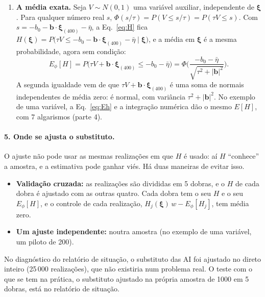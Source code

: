 \documentclass[11pt,a4paper]{article}
\newcommand{\xib}{\bm\xi}
\newcommand{\FS}{\mathrm{FS}}
\begin{document}
\begin{enumerate}
    $\hat g$ não vê: os modos além do 200.º, a não linearidade e o ruído do MEF. Se $\eta$ for normal, com média
    $\bar\eta$ e desvio $\tau$, e independente de $\hat g$, então $P(\FS < 1 \mid \xib) = P(\eta < -\hat g(\xib)) =
    \Phi\big((-\hat g(\xib) - \bar\eta)/\tau\big)$. Daí
    \begin{equation}
      H(\xib) = \Phi\Big(\frac{-\hat g(\xib) - \bar\eta}{\tau}\Big)
      = \Phi\Big(\frac{-b_0 - \bm b\cdot\xib_{(400)} - \bar\eta}{\tau}\Big).
      \label{eq:H}
    \end{equation}
    $\bar\eta$ e $\tau$ são ajustados por máxima verossimilhança nas realizações (o modelo probit: cada realização
    contribui com $\ln H$ se falhou e com $\ln(1 - H)$ se não). O $H$ vai de 0 a 1: é a probabilidade de falha que o
    substituto prevê para aquela realização, uma versão suave de $I$. Na versão anterior, $\bar\eta$, $\tau$ e $b_0$ se
    chamavam $c$, $s$ e $a$.
  \item \textbf{A média exata.} Seja $V \sim N(0, 1)$ uma variável auxiliar, independente de $\xib$. Para qualquer número
    real $s$, $\Phi(s/\tau) = P(V \le s/\tau) = P(\tau V \le s)$. Com $s = -b_0 - \bm b\cdot\xib_{(400)} - \bar\eta$, a
    Eq.~\eqref{eq:H} fica $H(\xib) = P\big(\tau V \le -b_0 - \bm b\cdot\xib_{(400)} - \bar\eta \mid \xib\big)$, e a média
    em $\xib$ é a mesma probabilidade, agora sem condição:
    \begin{equation}
      E_\phi[H] = P\big(\tau V + \bm b\cdot\xib_{(400)} \le -b_0 - \bar\eta\big)
      = \Phi\Big(\frac{-b_0 - \bar\eta}{\sqrt{\tau^2 + |\bm b|^2}}\Big).
      \label{eq:Eh}
    \end{equation}
    A segunda igualdade vem de que $\tau V + \bm b\cdot\xib_{(400)}$ é uma soma de normais independentes de média zero:
    é normal, com variância $\tau^2 + |\bm b|^2$. No exemplo de uma variável, a Eq.~\eqref{eq:Eh} e a integração numérica
    dão o mesmo $E[H]$, com 7 algarismos (parte 4).
\end{enumerate}

\paragraph{5. Onde se ajusta o substituto.} O ajuste não pode usar as mesmas realizações em que $H$ é usado: aí $H$
``conhece'' a amostra, e a estimativa pode ganhar viés. Há duas maneiras de evitar isso.
\begin{itemize}
  \item \textbf{Validação cruzada:} as realizações são divididas em 5 dobras, e o $H$ de cada dobra é ajustado com as
    outras quatro. Cada dobra tem o seu $H$ e o seu $E_\phi[H]$, e o controle de cada realização, $H_j(\xib)\,w -
    E_\phi[H_j]$, tem média zero.
  \item \textbf{Um ajuste independente:} noutra amostra (no exemplo de uma variável, um piloto de 200).
\end{itemize}
No diagnóstico do relatório de situação, o substituto das AI foi ajustado no direto inteiro (25\,000 realizações), que
não existiria num problema real. O teste com o que se tem na prática, o substituto ajustado na própria amostra de 1000
em 5 dobras, está no relatório de situação.
\end{document}
